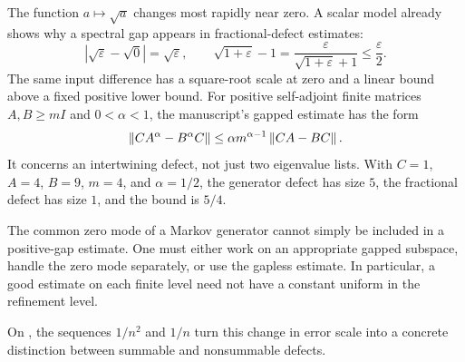 The function $a\mapsto\sqrt a$ changes most rapidly near zero. A scalar model already shows why a spectral gap appears in fractional-defect estimates:
\[
|\sqrt\varepsilon-\sqrt0|=\sqrt\varepsilon,
\qquad
\sqrt{1+\varepsilon}-1
=\frac{\varepsilon}{\sqrt{1+\varepsilon}+1}\le\frac\varepsilon2.
\]
The same input difference has a square-root scale at zero and a linear bound above a fixed positive lower bound.
For positive self-adjoint finite matrices $A,B\ge mI$ and $0<\alpha<1$, the manuscript's gapped estimate has the form
\[
\left\lVert CA^\alpha-B^\alpha C\right\rVert
\le \alpha m^{\alpha-1}\left\lVert CA-BC\right\rVert.
\]
It concerns an intertwining defect, not just two eigenvalue lists. With $C=1$, $A=4$, $B=9$, $m=4$, and $\alpha=1/2$, the generator defect has size $5$, the fractional defect has size $1$, and the bound is $5/4$.

The common zero mode of a Markov generator cannot simply be included in a positive-gap estimate. One must either work on an appropriate gapped subspace, handle the zero mode separately, or use the gapless estimate. In particular, a good estimate on each finite level need not have a constant uniform in the refinement level.

On , the sequences $1/n^2$ and $1/n$ turn this change in error scale into a concrete distinction between summable and nonsummable defects.

